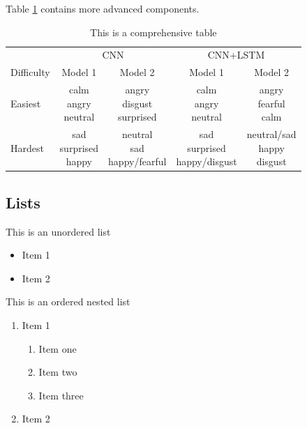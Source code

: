 Table \ref{tab:table2} contains more advanced components.
\begin{table}[H]
  \caption{This is a comprehensive table}
  \label{tab:table2}
  \centering
  \begin{tabular}{lcccc}
  \toprule
  & \multicolumn{2}{c}{CNN} & \multicolumn{2}{c}{CNN+LSTM} \\
  \cmidrule(r){2-3} \cmidrule(r){4-5}
    Difficulty     & Model 1 &  Model 2 & Model 1 & Model 2\\
    \midrule
    Easiest   & \Centerstack{ calm \\ angry \\ neutral}  &   \Centerstack{ angry \\ disgust \\ surprised}   &   \Centerstack{ calm \\ angry \\ neutral} & \Centerstack{ angry \\ fearful \\ calm} \\
    \midrule
    Hardest & \Centerstack{ sad \\ surprised \\ happy}   & \Centerstack{ neutral \\ sad \\ happy/fearful} & \Centerstack{ sad \\ surprised \\ happy/disgust}   &   \Centerstack{ neutral/sad \\ happy \\ disgust } \\
    \bottomrule
  \end{tabular}
\end{table}


\subsection{Lists}
This is an unordered list
\begin{itemize}
    \item Item 1
    \item Item 2
\end{itemize}

This is an ordered nested list
\begin{enumerate}
    \item Item 1
    \begin{enumerate}
        \item Item one
        \item Item two
        \item Item three
    \end{enumerate}
    \item Item 2
\end{enumerate}

